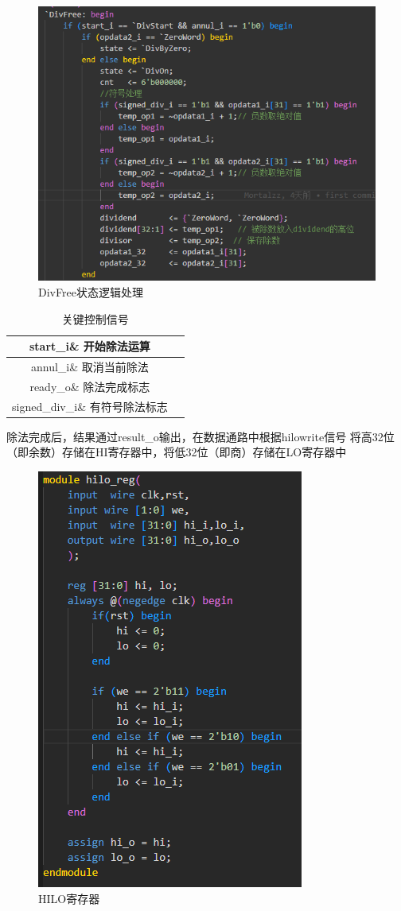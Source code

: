 \begin{figure}
\centering
\includegraphics[width=0.5\linewidth]{image/p2.png}
\caption{DivFree状态逻辑处理}
\label{fig:enter-label}
\end{figure}

\begin{table}
\centering
\begin{tabular}{|c|c|} \hline 
	start\_i\& 开始除法运算\\ \hline 
	annul\_i\& 取消当前除法\\ \hline 
	ready\_o\& 除法完成标志\\ \hline 
	signed\_div\_i\& 有符号除法标志\\ \hline
\end{tabular}
\caption{关键控制信号}
\label{关键控制信号}
\end{table}

除法完成后，结果通过result\_o输出，在数据通路中根据hilowrite信号 将高32位（即余数）存储在HI寄存器中，将低32位（即商）存储在LO寄存器中

\begin{figure}
\centering
\includegraphics[width=0.5\linewidth]{image/p3.png}
\caption{HILO寄存器}
\label{fig:enter-label}
\end{figure}

